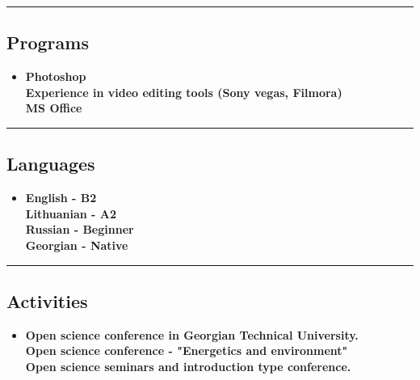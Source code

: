 \documentclass[10pt,letterpaper]{article}
\begin{document}
\hrule
\vspace{-1.0em}
\subsection*{Programs}
  \begin{itemize}
    \parskip=-1em
      \vspace{0.03em}

    \item[]
    {\textbf{Photoshop}}
     \\
    {\textbf{Experience in video editing tools (Sony vegas, Filmora)}}
    \\
    {\textbf{MS Office}}
  \end{itemize}

\hrule
\vspace{-1.0em}
\subsection*{Languages}
  \begin{itemize}
    \parskip=-1em
      \vspace{0.03em}

    \item[]
    {\textbf{English - B2}}
      \\
    {\textbf{Lithuanian - A2}}
    \\
    {\textbf{Russian - Beginner}}
    \\
    {\textbf{Georgian - Native}}
  \end{itemize}

\hrule
\vspace{-1.0em}
\subsection*{Activities}
  \begin{itemize}
    \parskip=-1em
      \vspace{0.03em}

    \item[]
    {\textbf{Open science conference in Georgian Technical University. }}
      \\
    {\textbf{Open science conference - "Energetics and environment"}}
    \\
    {\textbf{Open science seminars and introduction type conference.}}
    \\
  \end{itemize}
\end{document}

